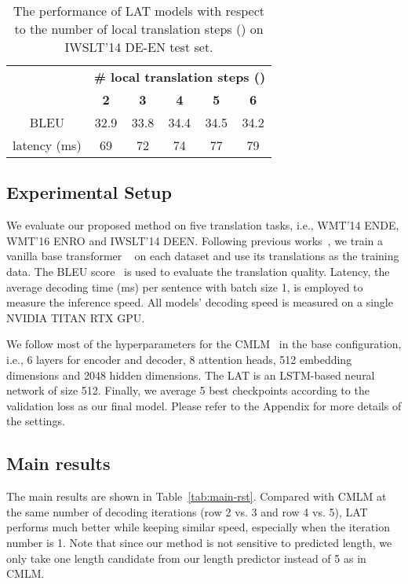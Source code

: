 \documentclass[11pt,a4paper]{article}
\begin{document}
\begin{table}[!ht]
    \centering
    \small
    \begin{tabular}{cccccc}
        \toprule
        & \multicolumn{5}{c}{\textbf{\# local translation steps () }}\\
        & \textbf{2} & \textbf{3} & \textbf{4} & \textbf{5} & \textbf{6}\\
        \midrule
        BLEU &  32.9  &33.8 & 34.4 & 34.5 & 34.2\\
        latency (ms) & 69 & 72 & 74 & 77 & 79 \\
        \bottomrule
    \end{tabular}
    \caption{The performance of LAT models with respect to the number of local translation steps () on IWSLT'14 DE-EN test set.}
    \label{tab:lat-step}
\end{table}


\subsection{Experimental Setup}
We evaluate our proposed method on five translation tasks, i.e., WMT'14 ENDE, WMT'16 ENRO and IWSLT'14 DEEN. Following previous works~\cite{hinton2015distilling,kim-rush-2016-sequence,gu2017non,zhou2019understanding},  we train a vanilla base transformer ~\cite{vaswani2017attention} on each dataset and use its translations as the training data. The BLEU score~\cite{papineni2002bleu} is used to evaluate the translation quality. Latency, the average decoding time (ms) per sentence with batch size 1, is employed to measure the inference speed. All models' decoding speed is measured on
a single NVIDIA TITAN RTX GPU.

We follow most of the hyperparameters for the CMLM~\cite{ghazvininejad-etal-2019-mask} in the base configuration, i.e., 6 layers for encoder and decoder, 8 attention heads, 512 embedding dimensions and 2048 hidden dimensions. The LAT is an LSTM-based neural network of size 512. 
Finally, we average 5 best checkpoints according to the validation loss as our final model. Please refer to the Appendix for more details of the settings. 

\subsection{Main results}
The main results are shown in Table~\ref{tab:main-rst}. Compared with CMLM at the same number of decoding iterations (row 2 vs. 3 and row 4 vs. 5), LAT performs much better while keeping similar speed, especially when the iteration number is 1. 
Note that since our method is not sensitive to predicted length, we only take one length candidate from our length predictor instead of 5 as in CMLM.
\end{document}

